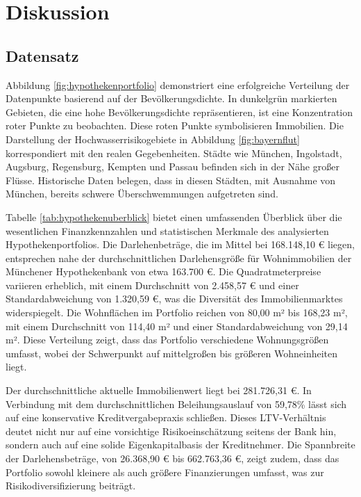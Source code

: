 
\section{Diskussion}
\subsection{Datensatz}

Abbildung \ref{fig:hypothekenportfolio} demonstriert eine erfolgreiche Verteilung der Datenpunkte basierend auf der Bevölkerungsdichte. In dunkelgrün markierten Gebieten, die eine hohe Bevölkerungsdichte repräsentieren, ist eine Konzentration roter Punkte zu beobachten. Diese roten Punkte symbolisieren Immobilien.
Die Darstellung der Hochwasserrisikogebiete in Abbildung \ref{fig:bayernflut} korrespondiert mit den realen Gegebenheiten. Städte wie München, Ingolstadt, Augsburg, Regensburg, Kempten und Passau befinden sich in der Nähe großer Flüsse. Historische Daten belegen, dass in diesen Städten, mit Ausnahme von München, bereits schwere Überschwemmungen aufgetreten sind.

Tabelle \ref{tab:hypothekenuberblick} bietet einen umfassenden Überblick über die wesentlichen Finanzkennzahlen und statistischen Merkmale des analysierten Hypothekenportfolios. Die Darlehenbeträge, die im Mittel bei 168.148,10 € liegen, entsprechen nahe der durchschnittlichen Darlehensgröße für Wohnimmobilien der Münchener Hypothekenbank von etwa 163.700 €. Die Quadratmeterpreise variieren erheblich, mit einem Durchschnitt von 2.458,57 € und einer Standardabweichung von 1.320,59 €, was die Diversität des Immobilienmarktes widerspiegelt. Die Wohnflächen im Portfolio reichen von 80,00 m² bis 168,23 m², mit einem Durchschnitt von 114,40 m² und einer Standardabweichung von 29,14 m². Diese Verteilung zeigt, dass das Portfolio verschiedene Wohnungsgrößen umfasst, wobei der Schwerpunkt auf mittelgroßen bis größeren Wohneinheiten liegt.

Der durchschnittliche aktuelle Immobilienwert liegt bei 281.726,31 €. In Verbindung mit dem durchschnittlichen Beleihungsauslauf von 59,78\% lässt sich auf eine konservative Kreditvergabepraxis schließen. Dieses LTV-Verhältnis deutet nicht nur auf eine vorsichtige Risikoeinschätzung seitens der Bank hin, sondern auch auf eine solide Eigenkapitalbasis der Kreditnehmer. Die Spannbreite der Darlehensbeträge, von 26.368,90 € bis 662.763,36 €, zeigt zudem, dass das Portfolio sowohl kleinere als auch größere Finanzierungen umfasst, was zur Risikodiversifizierung beiträgt.

